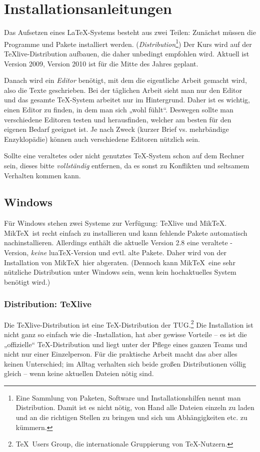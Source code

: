 \documentclass[12pt,ngerman]{scrartcl}
\newcommand{\TeXlive}{\TeX\textsf{live}\xspace}
\newcommand{\luaTeX}{\textsf{lua}\TeX\xspace}
\begin{document}
\section{Installationsanleitungen}
Das Aufsetzen eines \LaTeX-Systems besteht aus zwei Teilen: Zunächst müssen die Programme und Pakete installiert werden. (\emph{Distribution}\footnote{Eine Sammlung von Paketen, Software und Installationshilfen nennt man Distribution. Damit ist es nicht nötig, von Hand alle Dateien einzeln zu laden und an die richtigen Stellen zu bringen und sich um Abhängigkeiten etc. zu kümmern.}) Der Kurs wird auf der \TeXlive-Distribution aufbauen, die daher unbedingt empfohlen wird. Aktuell ist Version 2009, Version 2010 ist für die Mitte des Jahres geplant.

Danach wird ein \emph{Editor} benötigt, mit dem die eigentliche Arbeit gemacht wird, also die Texte geschrieben. Bei der täglichen Arbeit sieht man nur den Editor und das gesamte \TeX-System arbeitet nur im Hintergrund. Daher ist es wichtig, einen Editor zu finden, in dem man sich „wohl fühlt“. Deswegen sollte man verschiedene Editoren testen und herausfinden, welcher am besten für den eigenen Bedarf geeignet ist. Je nach Zweck (kurzer Brief vs. mehrbändige Enzyklopädie) können auch verschiedene Editoren nützlich sein.

Sollte eine veraltetes oder nicht genutztes \TeX-System schon auf dem Rechner sein, dieses bitte \emph{vollständig} entfernen, da es sonst zu Konflikten und seltsamem Verhalten kommen kann.

\subsection{Windows}
Für Windows stehen zwei Systeme zur Verfügung: \TeXlive und Mik\TeX. Mik\TeX\ ist recht einfach zu installieren und kann fehlende Pakete automatisch nachinstallieren. Allerdings enthält die aktuelle Version 2.8 eine veraltete \XeTeX-Version, \emph{keine} \luaTeX-Version und evtl. alte Pakete. Daher wird von der Installation von Mik\TeX\ hier abgeraten. (Dennoch kann Mik\TeX\ eine sehr nützliche Distribution unter Windows sein, wenn kein hochaktuelles System benötigt wird.)

\subsubsection{Distribution: \TeX\textbf{\textsf{live}}}
Die \TeXlive-Distribution ist eine \TeX-Distribution der TUG.\footnote{\TeX\ Users Group, die internationale Gruppierung von \TeX-Nutzern.} Die Installation ist nicht ganz so einfach wie die \MikTeX-Installation, hat aber gewisse Vorteile – es ist die „offizielle“ \TeX-Distribution und liegt unter der Pflege eines ganzen Teams und nicht nur einer Einzelperson. Für die praktische Arbeit macht das aber alles keinen Unterschied; im Alltag verhalten sich beide großen Distributionen völlig gleich – wenn keine aktuellen Dateien nötig sind.
\end{document}

